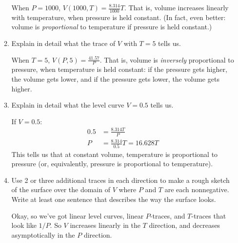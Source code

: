 \documentclass[10pt]{article}
\newenvironment{red}{\color{red}}{\ignorespacesafterend}
\begin{document}
\begin{enumerate}[leftmargin=0pt]
\begin{enumerate}
        \begin{red}
        When $P = 1000$, $V(1000, T) = \frac{8.314}{1000} T$. That is, volume increases linearly with temperature, when pressure is held constant. (In fact, even better: volume is \textit{proportional} to temperature if pressure is held constant.)
        \end{red}
        \item Explain in detail what the trace of $V$ with $T = 5$ tells us.
        
        \begin{red}
        When $T = 5$, $V(P, 5) = \frac{41.57}{P}$. That is, volume is \textit{inversely} proportional to pressure, when temperature is held constant: if the pressure gets higher, the volume gets lower, and if the pressure gets lower, the volume gets higher.
        \end{red}
        \item Explain in detail what the level curve $V = 0.5$ tells us.
        
        \begin{red}
        If $V = 0.5$:
        \begin{align*}
            0.5 &= \frac{8.314 T}{P}\\
            P &= \frac{8.314}{0.5} T = 16.628 T
        \end{align*}
        This tells us that at constant volume, temperature is proportional to pressure (or, equivalently, pressure is proportional to temperature).
        \end{red}
        \item Use 2 or three additional traces in each direction to make a rough sketch of the surface over the domain of $V$ where $P$ and $T$ are each nonnegative. Write at least one sentence that describes the way the surface looks.
        
        \begin{red}
        Okay, so we've got linear level curves, linear $P$-traces, and $T$-traces that look like $1/P$. So $V$ increases linearly in the $T$ direction, and decreases asymptotically in the $P$ direction.
        

\end{red}
\end{enumerate}
\end{enumerate}
\end{document}
